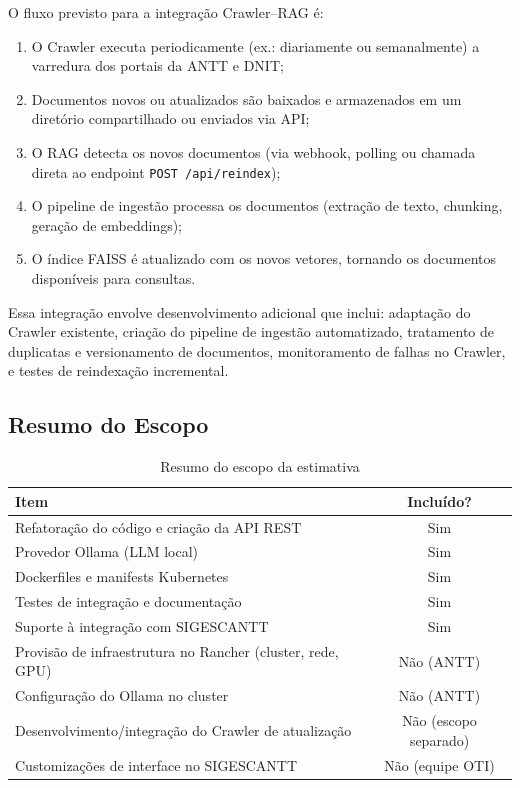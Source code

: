 \documentclass[12pt, a4paper]{article}
\begin{document}
O fluxo previsto para a integração Crawler--RAG é:

\begin{enumerate}[label=\textbf{\arabic*.}]
  \item O Crawler executa periodicamente (ex.: diariamente ou semanalmente) a varredura dos portais da ANTT e DNIT;
  \item Documentos novos ou atualizados são baixados e armazenados em um diretório compartilhado ou enviados via API;
  \item O RAG detecta os novos documentos (via webhook, polling ou chamada direta ao endpoint \texttt{POST /api/reindex});
  \item O pipeline de ingestão processa os documentos (extração de texto, chunking, geração de embeddings);
  \item O índice FAISS é atualizado com os novos vetores, tornando os documentos disponíveis para consultas.
\end{enumerate}

\noindent Essa integração envolve desenvolvimento adicional que inclui: adaptação do Crawler existente, criação do pipeline de ingestão automatizado, tratamento de duplicatas e versionamento de documentos, monitoramento de falhas no Crawler, e testes de reindexação incremental. 

\subsection{Resumo do Escopo}

\begin{table}[H]
\centering
\small
\caption{Resumo do escopo da estimativa}
\label{tab:resumo_escopo}
\begin{tabularx}{\textwidth}{X c}
\toprule
\textbf{Item} & \textbf{Incluído?} \\
\midrule
Refatoração do código e criação da API REST & Sim \\
Provedor Ollama (LLM local) & Sim \\
Dockerfiles e manifests Kubernetes & Sim \\
Testes de integração e documentação & Sim \\
Suporte à integração com SIGESCANTT & Sim \\
Provisão de infraestrutura no Rancher (cluster, rede, GPU) & Não (ANTT) \\
Configuração do Ollama no cluster & Não (ANTT) \\
Desenvolvimento/integração do Crawler de atualização & Não (escopo separado) \\
Customizações de interface no SIGESCANTT & Não (equipe OTI) \\
\bottomrule
\end{tabularx}
\end{table}
\end{document}
